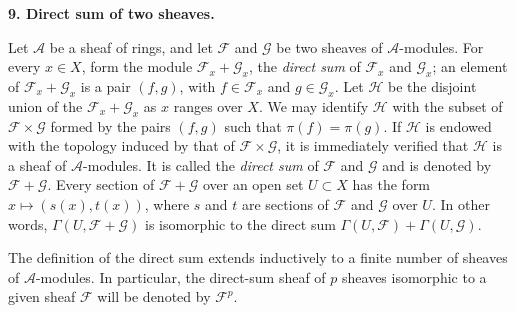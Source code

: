 
\medskip
{}\label{fac:I:1:no:9}
\textbf{9. Direct sum of two sheaves.}

Let $\mathcal{A}$ be a sheaf of rings, and let $\mathcal{F}$ and $\mathcal{G}$ be two sheaves of $\mathcal{A}$-modules. For every $x\in X$, form the module $\mathcal{F}_x+\mathcal{G}_x$, the \textit{direct sum} of $\mathcal{F}_x$ and $\mathcal{G}_x$; an element of $\mathcal{F}_x+\mathcal{G}_x$ is a pair $(f,g)$, with $f\in\mathcal{F}_x$ and $g\in\mathcal{G}_x$. Let $\mathcal{H}$ be the disjoint union of the $\mathcal{F}_x+\mathcal{G}_x$ as $x$ ranges over $X$. We may identify $\mathcal{H}$ with the subset of $\mathcal{F}\times\mathcal{G}$ formed by the pairs $(f,g)$ such that $\pi(f)=\pi(g)$. If $\mathcal{H}$ is endowed with the topology induced by that of $\mathcal{F}\times\mathcal{G}$, it is immediately verified that $\mathcal{H}$ is a sheaf of $\mathcal{A}$-modules. It is called the \textit{direct sum} of $\mathcal{F}$ and $\mathcal{G}$ and is denoted by $\mathcal{F}+\mathcal{G}$. Every section of $\mathcal{F}+\mathcal{G}$ over an open set $U\subset X$ has the form $x\mapsto(s(x),t(x))$, where $s$ and $t$ are sections of $\mathcal{F}$ and $\mathcal{G}$ over $U$. In other words, $\Gamma(U,\mathcal{F}+\mathcal{G})$ is isomorphic to the direct sum $\Gamma(U,\mathcal{F})+\Gamma(U,\mathcal{G})$.

The definition of the direct sum extends inductively to a finite number of sheaves of $\mathcal{A}$-modules. In particular, the direct-sum sheaf of $p$ sheaves isomorphic to a given sheaf $\mathcal{F}$ will be denoted by $\mathcal{F}^p$.

